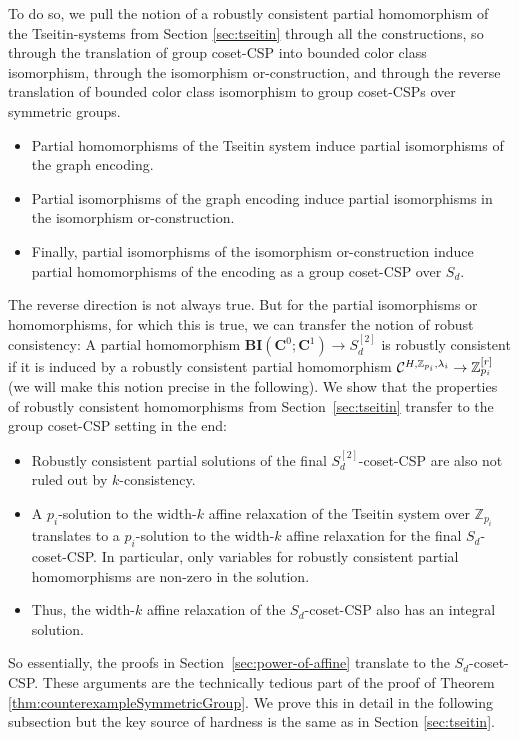 \documentclass[a4paper,english, thm-restate]{lipics-v2021}
\newcommand{\ZZ}{\mathbb{Z}}
\newcommand{\StructC}{\mathbf{C}}
\newcommand{\bcisosys}[2]{\mathbf{BI}(#1;#2)}
\newcommand{\CosetGrpTmplt}[2]{#1^{[#2]}}
\newcommand{\Sym}[1]{S_{#1}}
\newcommand{\SymStruct}[2]{\CosetGrpTmplt{\Sym{#1}}{#2}}
\begin{document}
	To do so, we pull the notion of a robustly consistent partial homomorphism
	of the Tseitin-systems from Section \ref{sec:tseitin} through  all the constructions, so through the translation of group coset-CSP into bounded color class isomorphism, through the isomorphism or-construction,
	and through the reverse translation of bounded color class isomorphism 
	to group coset-CSPs over symmetric groups.
	\begin{itemize}
		\item Partial homomorphisms of the Tseitin system induce partial isomorphisms of the graph encoding.
		\item Partial isomorphisms of the graph encoding
		induce partial isomorphisms in the isomorphism or-construction.
		\item Finally, partial isomorphisms of the isomorphism or-construction
		induce partial homomorphisms of the encoding as a group coset-CSP over $\Sym{d}$.
	\end{itemize}
	The reverse direction is not always true.
	But for the partial isomorphisms or homomorphisms,
	for which this is true,
	we can transfer the notion of robust consistency:
	A partial homomorphism
	$\bcisosys{\StructC^0}{\StructC^1} \to \CosetGrpTmplt{\Sym{d}}{2}$ is
	robustly consistent
	if it is induced
	by a robustly consistent partial homomorphism 
	$\grpCSP{H}{\ZZ_{p_i}}{\lambda_i} \to \CosetGrpTmplt{\ZZ_{p_i}}{r}$
	(we will make this notion precise in the following).
	We show that the properties of robustly consistent homomorphisms from Section~\ref{sec:tseitin} transfer to the group coset-CSP setting in the end:
	\begin{itemize}
		\item Robustly consistent partial solutions of the final $\SymStruct{d}{2}$-coset-CSP are also
		not ruled out by $k$-consistency.
		\item A $p_i$-solution to the width-$k$ affine relaxation of the Tseitin
		system over $\ZZ_{p_i}$ translates to a $p_i$-solution to the width-$k$ affine relaxation for the final $\Sym{d}$-coset-CSP.
		In particular, only variables for robustly consistent partial homomorphisms are non-zero in the solution.
		\item Thus, the width-$k$ affine relaxation of the  $\Sym{d}$-coset-CSP also has
		an integral solution.
	\end{itemize}
	So essentially, the proofs in Section~\ref{sec:power-of-affine}
	translate to the $\Sym{d}$-coset-CSP.
	These arguments are the technically tedious part of the proof of Theorem \ref{thm:counterexampleSymmetricGroup}.
	We prove this in detail in the following subsection
	but the key source of hardness is the same as in Section \ref{sec:tseitin}. 
	
\end{document}

